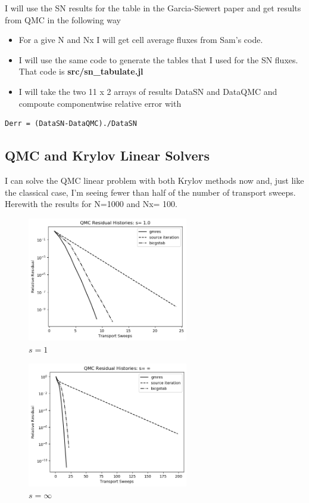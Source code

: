 I will use the SN results for the table in the Garcia-Siewert paper and
get results from QMC in the following way

\begin{itemize}
\item
  For a give N and Nx I will get cell average fluxes from Sam's code.
\item
  I will use the same code to generate the tables that I used for the SN
  fluxes. That code is \textbf{src/sn\_tabulate.jl}
\item
  I will take the two 11 x 2 arrays of results DataSN and DataQMC and
  compoute componentwise relative error with
\end{itemize}

\begin{verbatim}
Derr = (DataSN-DataQMC)./DataSN
\end{verbatim}

\subsection{QMC and Krylov Linear Solvers}
\label{qmc-and-krylov-linear-solvers}

I can solve the QMC linear problem with both Krylov methods now and,
just like the classical case, I'm seeing fewer than half of the number
of transport sweeps. Herewith the results for N=1000 and Nx= 100.

\begin{figure}[t]%
  \centering
  \includegraphics[trim = 10mm 0mm 15mm 15mm, width=70mm]{FIGURES/seqone.png}
  \caption{$s = 1$}
  \label{fig:easy}
\end{figure}

\begin{figure}[t]%
  \centering
  \includegraphics[trim = 10mm 0mm 15mm 15mm, width=70mm]{FIGURES/seqinf.png}
  \caption{$s = \infty$}
  \label{fig:hard}
\end{figure}

